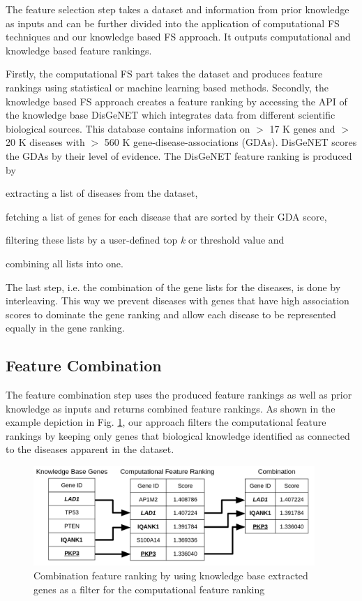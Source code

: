 The feature selection step takes a dataset and information from prior knowledge as inputs and can be further divided into the application of computational FS techniques and our knowledge based FS approach. 
It outputs computational and knowledge based feature rankings.

Firstly, the computational FS part takes the dataset and produces feature rankings using statistical or machine learning based methods.  
Secondly, the knowledge based FS approach creates a feature ranking by accessing the API of the knowledge base DisGeNET which integrates data from different scientific biological sources\cite{pinero2015disgenet}.
This database contains information on $>$ 17 K genes and $>$ 20 K diseases with $>$ 560 K gene-disease-associations (GDAs).
DisGeNET scores the GDAs by their level of evidence. 
The DisGeNET feature ranking is produced by
\begin{enumerate*}[label={\alph*)},font={\bfseries}]
    \item extracting a list of diseases from the dataset,
    \item fetching a list of genes for each disease that are sorted by their GDA score,
    \item filtering these lists by a user-defined top \emph{k} or threshold value and
    \item combining all lists into one.
\end{enumerate*}
The last step, i.e. the combination of the gene lists for the diseases, is done by interleaving. 
This way we prevent diseases with genes that have high association scores to dominate the gene ranking and allow each disease to be represented equally in the gene ranking.

\subsection{Feature Combination} 

The feature combination step uses the produced feature rankings as well as prior knowledge as inputs and returns combined feature rankings. 
As shown in the example depiction in Fig. \ref{fig:combination}, our approach filters the computational feature rankings by keeping only genes that biological knowledge identified as connected to the diseases apparent in the dataset. 

\begin{figure}[h!]
\setlength{\belowcaptionskip}{-15pt}
\centering
\includegraphics[width=0.95\textwidth]{figures/combination3.png}
\caption{Combination feature ranking by using knowledge base extracted genes as a filter for the computational feature ranking}
\label{fig:combination}
\end{figure}

